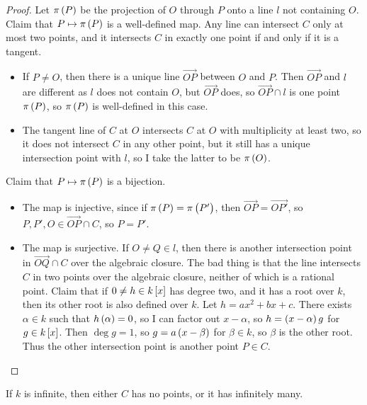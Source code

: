\begin{proof}
Let $ \pi\br{P} $ be the projection of $ O $ through $ P $ onto a line $ l $ not containing $ O $. Claim that $ P \mapsto \pi\br{P} $ is a well-defined map. Any line can intersect $ C $ only at most two points, and it intersects $ C $ in exactly one point if and only if it is a tangent.
\begin{itemize}
\item If $ P \ne O $, then there is a unique line $ \overrightarrow{OP} $ between $ O $ and $ P $. Then $ \overrightarrow{OP} $ and $ l $ are different as $ l $ does not contain $ O $, but $ \overrightarrow{OP} $ does, so $ \overrightarrow{OP} \cap l $ is one point $ \pi\br{P} $, so $ \pi\br{P} $ is well-defined in this case.
\item The tangent line of $ C $ at $ O $ intersects $ C $ at $ O $ with multiplicity at least two, so it does not intersect $ C $ in any other point, but it still has a unique intersection point with $ l $, so I take the latter to be $ \pi\br{O} $.
\end{itemize}
Claim that $ P \mapsto \pi\br{P} $ is a bijection.
\begin{itemize}
\item The map is injective, since if $ \pi\br{P} = \pi\br{P'} $, then $ \overrightarrow{OP} = \overrightarrow{OP'} $, so $ P, P', O \in \overrightarrow{OP} \cap C $, so $ P = P' $.
\item The map is surjective. If $ O \ne Q \in l $, then there is another intersection point in $ \overrightarrow{OQ} \cap C $ over the algebraic closure. The bad thing is that the line intersects $ C $ in two points over the algebraic closure, neither of which is a rational point. Claim that if $ 0 \ne h \in k\sbr{x} $ has degree two, and it has a root over $ k $, then its other root is also defined over $ k $. Let $ h = ax^2 + bx + c $. There exists $ \alpha \in k $ such that $ h\br{\alpha} = 0 $, so I can factor out $ x - \alpha $, so $ h = \br{x - \alpha}g $ for $ g \in k\sbr{x} $. Then $ \deg g = 1 $, so $ g = a\br{x - \beta} $ for $ \beta \in k $, so $ \beta $ is the other root. Thus the other intersection point is another point $ P \in C $.
\end{itemize}
\end{proof}

\begin{corollary}
If $ k $ is infinite, then either $ C $ has no points, or it has infinitely many.
\end{corollary}

